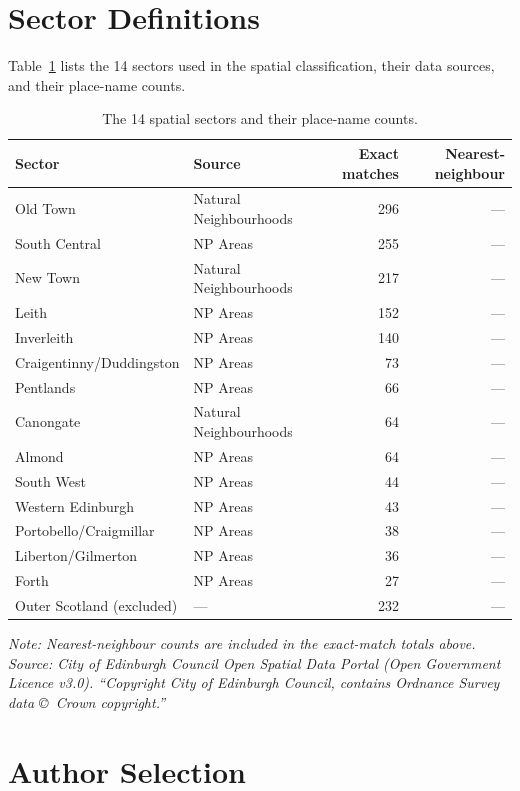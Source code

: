 \documentclass[logo,msc]{infthesis}
\begin{document}
\section{Sector Definitions}
 
Table~\ref{tab:sectors} lists the 14 sectors used in the spatial classification, their data sources, and their place-name counts.
 
\begin{table}[h]
\centering
\caption{The 14 spatial sectors and their place-name counts.}
\label{tab:sectors}
\small
\begin{tabular}{llrr}
\toprule
Sector & Source & Exact matches & Nearest-neighbour \\
\midrule
Old Town & Natural Neighbourhoods & 296 & --- \\
South Central & NP Areas & 255 & --- \\
New Town & Natural Neighbourhoods & 217 & --- \\
Leith & NP Areas & 152 & --- \\
Inverleith & NP Areas & 140 & --- \\
Craigentinny/Duddingston & NP Areas & 73 & --- \\
Pentlands & NP Areas & 66 & --- \\
Canongate & Natural Neighbourhoods & 64 & --- \\
Almond & NP Areas & 64 & --- \\
South West & NP Areas & 44 & --- \\
Western Edinburgh & NP Areas & 43 & --- \\
Portobello/Craigmillar & NP Areas & 38 & --- \\
Liberton/Gilmerton & NP Areas & 36 & --- \\
Forth & NP Areas & 27 & --- \\
\midrule
Outer Scotland (excluded) & --- & 232 & --- \\
\bottomrule
\end{tabular}
\end{table}
 
\noindent\small\textit{Note: Nearest-neighbour counts are included in the exact-match totals above. Source: City of Edinburgh Council Open Spatial Data Portal (Open Government Licence v3.0). ``Copyright City of Edinburgh Council, contains Ordnance Survey data \copyright\ Crown copyright.''}
 
\section{Author Selection}
 
\end{document}
